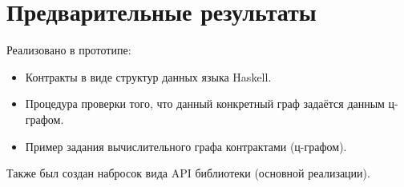 \section{Предварительные результаты}

Реализовано в прототипе:
\begin{itemize}
    \setlength\itemsep{-0.2em}
    \item Контракты в виде структур данных языка Haskell.
    \item Процедура проверки того, что данный конкретный граф задаётся данным ц-графом.
    \item Пример задания вычислительного графа контрактами (ц-графом).
\end{itemize}

Также был создан набросок вида API библиотеки (основной реализации).
